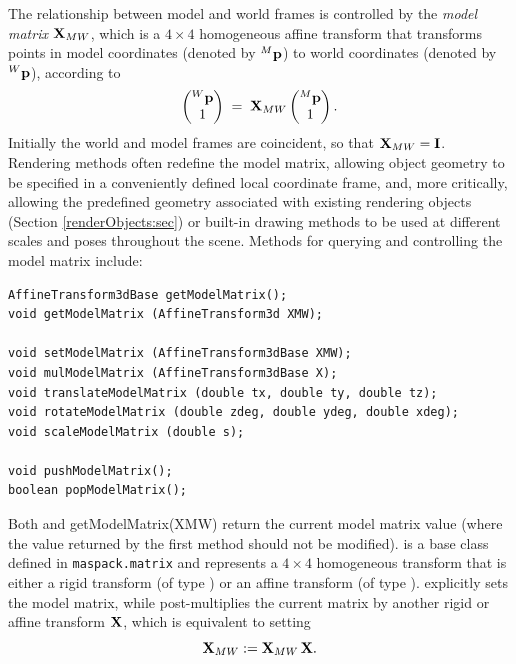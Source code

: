 The relationship between model and world frames is controlled by the
{\it model matrix} ${\bf X}_{MW}$, which is a $4 \times 4$ homogeneous
affine transform that transforms points in model coordinates (denoted
by ${}^M{\bf p}$) to world coordinates (denoted by ${}^W{\bf p}$), according to
%
\begin{equation*}
\left(\begin{matrix} {}^W{\bf p} \\ 1 \end{matrix}\right) \;=\;
{\bf X}_{MW} \left(\begin{matrix} {}^M{\bf p} \\ 1 \end{matrix}\right).
\end{equation*}
%
Initially the world and model frames are coincident, so that ${\bf X}_{MW}
= {\bf I}$. Rendering methods often redefine the model matrix, allowing
object geometry to be specified in a conveniently defined local
coordinate frame, and, more critically, allowing the predefined
geometry associated with existing rendering objects (Section
\ref{renderObjects:sec}) or built-in drawing methods to be used at
different scales and poses throughout the scene.  Methods for querying
and controlling the model matrix include:
%
\begin{lstlisting}[]
AffineTransform3dBase getModelMatrix();
void getModelMatrix (AffineTransform3d XMW);

void setModelMatrix (AffineTransform3dBase XMW);
void mulModelMatrix (AffineTransform3dBase X);
void translateModelMatrix (double tx, double ty, double tz);
void rotateModelMatrix (double zdeg, double ydeg, double xdeg);
void scaleModelMatrix (double s);

void pushModelMatrix();
boolean popModelMatrix();
\end{lstlisting}
%
Both  and
%
{getModelMatrix(XMW)} return the current model matrix value (where the
value returned by the first method should not be modified).
 is a base class defined
in {\tt maspack.matrix} and represents a $4 \times 4$ homogeneous transform
that is either a rigid transform
(of type
) or an affine transform
(of type ).
explicitly sets the model matrix, while
post-multiplies the current matrix by another rigid or
affine transform ${\bf X}$, which is equivalent to
setting
%
\begin{equation*}
{\bf X}_{MW} := {\bf X}_{MW} \, {\bf X}.
\end{equation*}
